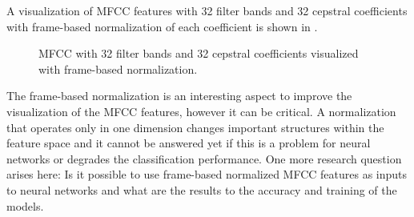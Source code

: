 A visualization of MFCC features with 32 filter bands and 32 cepstral coefficients with frame-based normalization of each coefficient is shown in .
\begin{figure}[!ht]
  \centering
  \caption{MFCC with 32 filter bands and 32 cepstral coefficients visualized with frame-based normalization.}
  \label{fig:signal_mfcc_showcase_mfcc32}
\end{figure}
\FloatBarrier
\noindent
The frame-based normalization is an interesting aspect to improve the visualization of the MFCC features, however it can be critical. 
A normalization that operates only in one dimension changes important structures within the feature space and it cannot be answered yet if this is a problem for neural networks or degrades the classification performance.
One more research question arises here: Is it possible to use frame-based normalized MFCC features as inputs to neural networks and what are the results to the accuracy and training of the models.


